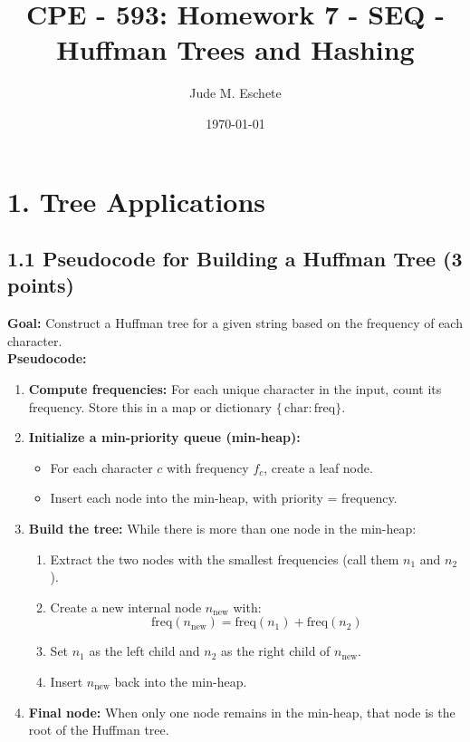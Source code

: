 \documentclass[12pt]{article}
\title{\textbf{CPE - 593: Homework 7 - SEQ - Huffman Trees and Hashing}}
\author{Jude M. Eschete}
\date{\today}
\begin{document}
	\maketitle
	
	\section*{1. Tree Applications}
	
	\subsection*{1.1 Pseudocode for Building a Huffman Tree (3 points)}
	\noindent \textbf{Goal:} Construct a Huffman tree for a given string based on the frequency of each character.\\[6pt]
	\noindent \textbf{Pseudocode:}
	\begin{enumerate}
		\item \textbf{Compute frequencies:} For each unique character in the input, count its frequency. Store this in a map or dictionary \(\{\,\text{char} : \text{freq}\}\).
		\item \textbf{Initialize a min-priority queue (min-heap):} 
		\begin{itemize}
			\item For each character \(c\) with frequency \(f_c\), create a leaf node. 
			\item Insert each node into the min-heap, with priority = frequency.
		\end{itemize}
		\item \textbf{Build the tree:} While there is more than one node in the min-heap:
		\begin{enumerate}
			\item Extract the two nodes with the smallest frequencies (call them \(n_1\) and \(n_2\)).
			\item Create a new internal node \(n_{\text{new}}\) with:
			\[
			\text{freq}(n_{\text{new}}) = \text{freq}(n_1) + \text{freq}(n_2)
			\]
			\item Set \(n_1\) as the left child and \(n_2\) as the right child of \(n_{\text{new}}\).
			\item Insert \(n_{\text{new}}\) back into the min-heap.
		\end{enumerate}
		\item \textbf{Final node:} When only one node remains in the min-heap, that node is the root of the Huffman tree.
	\end{enumerate}
	
\end{document}
